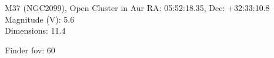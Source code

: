 \begin{block}{M37 (NGC2099), Open Cluster in Aur}
    RA: 05:52:18.35, Dec: +32:33:10.8 \\ 
    Magnitude (V): 5.6 \\ 
    Dimensions: 11.4 

    Finder fov: 60 
\end{block}